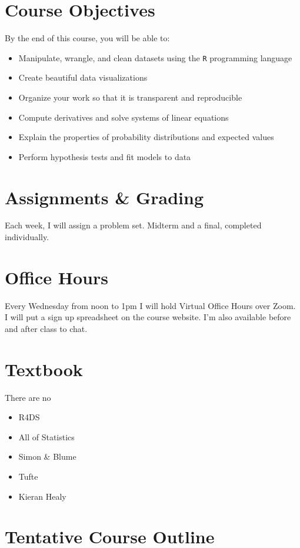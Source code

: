 \documentclass[11pt, letterpaper]{article}
\begin{document}
\section*{Course Objectives}
By the end of this course, you will be able to:
\begin{itemize}
	\item Manipulate, wrangle, and clean datasets using the \texttt{R} programming language
	\item Create beautiful data visualizations
	\item Organize your work so that it is transparent and reproducible
	\item Compute derivatives and solve systems of linear equations
	\item Explain the properties of probability distributions and expected values
	\item Perform hypothesis tests and fit models to data
\end{itemize}


\section*{Assignments \& Grading}

Each week, I will assign a problem set. Midterm and a final, completed individually.

\section*{Office Hours}
Every Wednesday from noon to 1pm I will hold Virtual Office Hours over Zoom. I will put a sign up spreadsheet on the course website. I'm also available before and after class to chat.

\section*{Textbook}
There are no 
\begin{itemize}
\item R4DS
\item All of Statistics
\item Simon \& Blume
\item Tufte
\item Kieran Healy
\end{itemize} 


\section*{Tentative Course Outline}
\end{document}
